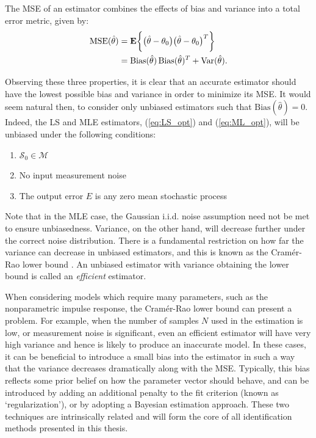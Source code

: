 \begin{defn}[MSE]
The MSE of an estimator combines the effects of bias and variance into a total error metric, given by:
\begin{align}
\operatorname{MSE}(\hat{\theta}) &=  \textbf{E} \bigg\{ \big( \hat{\theta} - \theta_0 \big) \big( \hat{\theta} - \theta_0 \big)^T \bigg\} \\
&= \operatorname{Bias}(\hat{\theta}) \operatorname{Bias}(\hat{\theta})^T + \operatorname{Var}(\hat{\theta}).
\end{align}
\end{defn}

Observing these three properties, it is clear that an accurate estimator should have the lowest possible bias and variance in order to minimize its MSE. It would seem natural then, to consider only unbiased estimators such that $\text{Bias}(\hat{\theta}) = 0$. Indeed, the LS and MLE estimators, (\ref{eq:LS_opt}) and (\ref{eq:ML_opt}), will be unbiased under the following conditions:
\begin{enumerate}
\item $\mathcal{S}_0 \in \mathcal{M}$
\item No input measurement noise
\item The output error $E$ is any zero mean stochastic process
\end{enumerate}
Note that in the MLE case, the Gaussian i.i.d. noise assumption need not be met to ensure unbiasedness. Variance, on the other hand, will decrease further under the correct noise distribution. There is a fundamental restriction on how far the variance can decrease in unbiased estimators, and this is known as the Cramér-Rao lower bound \cite{Pintelon2012}. An unbiased estimator with variance obtaining the lower bound is called an \emph{efficient} estimator. 

When considering models which require many parameters, such as the nonparametric impulse response, the Cramér-Rao lower bound can present a problem. For example, when the number of samples $N$ used in the estimation is low, or measurement noise is significant, even an efficient estimator will have very high variance and hence is likely to produce an inaccurate model. In these cases, it can be beneficial to introduce a small bias into the estimator in such a way that the variance decreases dramatically along with the MSE. Typically, this bias reflects some prior belief on how the parameter vector should behave, and can be introduced by adding an additional penalty to the fit criterion (known as `regularization'), or by adopting a Bayesian estimation approach. These two techniques are intrinsically related and will form the core of all identification methods presented in this thesis.

